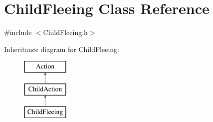 \hypertarget{class_child_fleeing}{}\section{Child\+Fleeing Class Reference}
\label{class_child_fleeing}


{\ttfamily \#include $<$Child\+Fleeing.\+h$>$}

Inheritance diagram for Child\+Fleeing\+:\begin{figure}[H]
\begin{center}
\leavevmode
\includegraphics[height=3.000000cm]{class_child_fleeing}
\end{center}
\end{figure}
